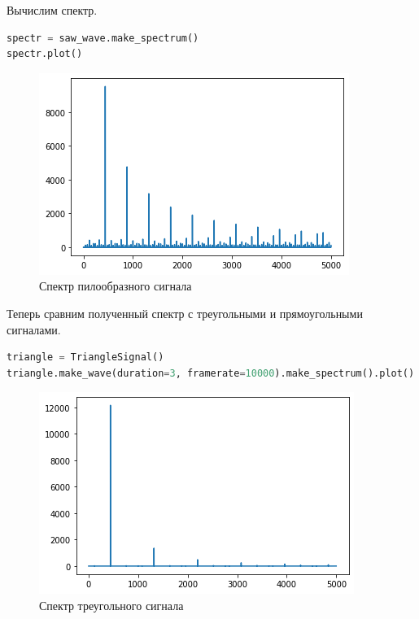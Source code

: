 Вычислим спектр.

\begin{lstlisting}[language=Python]
spectr = saw_wave.make_spectrum()
spectr.plot()
\end{lstlisting}

\begin{figure}[H]
	\begin{center}
		\includegraphics[scale=1]{fig/lab02/lab02_2.png}
		\caption{Спектр пилообразного сигнала}
	\end{center}
\end{figure}

Теперь сравним полученный спектр с треугольными и прямоугольными сигналами.

\begin{lstlisting}[language=Python]
triangle = TriangleSignal()
triangle.make_wave(duration=3, framerate=10000).make_spectrum().plot()
\end{lstlisting}

\begin{figure}[H]
	\begin{center}
		\includegraphics[scale=1]{fig/lab02/lab02_3.png}
		\caption{Спектр треугольного сигнала}
	\end{center}
\end{figure}

